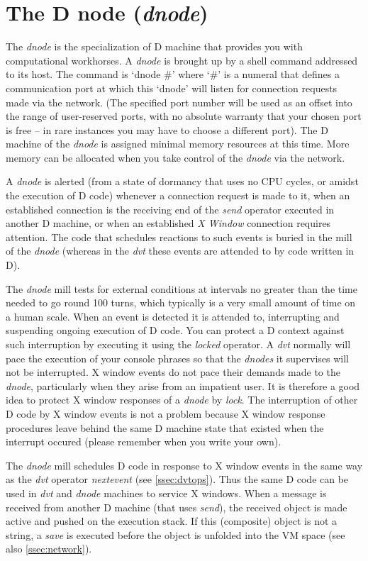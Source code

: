 \section{The D node (\emph{dnode})}\label{sec:dnode}

The \emph{dnode} is the specialization of D machine that provides you with computational workhorses. A \emph{dnode} is brought up by a shell command addressed to its host. The command is `dnode \#' where `\#' is a numeral that defines a communication port at which this `dnode' will listen for connection requests made via the network. (The specified port number will be used as an offset into the range of user-reserved ports, with no absolute warranty that your chosen port is free -- in rare instances you may have to choose a different port). The D machine of the \emph{dnode} is assigned minimal memory resources at this time. More memory can be allocated when you take control of the \emph{dnode} via the network.

 A \emph{dnode} is alerted (from a state of dormancy that uses no CPU cycles, or amidst the execution of D code) whenever a connection request is made to it, when an established connection is the receiving end of the \emph{send} operator executed in another D machine, or when an established \emph{X Window} connection requires attention. The code that schedules reactions to such events is buried in the mill of the \emph{dnode} (whereas in the \emph{dvt} these events are attended to by code written in D).

The \emph{dnode} mill tests for external conditions at intervals no greater than the time needed to go round 100 turns, which typically is a very small amount of time on a human scale. When an event is detected it is attended to, interrupting and suspending ongoing execution of D code.  You can protect a D context against such interruption by executing it using the \emph{locked} operator. A \emph{dvt} normally will pace the execution of your console phrases so that the \emph{dnodes} it supervises will not be interrupted. X window events do not pace their demands made to the \emph{dnode}, particularly when they arise from an impatient user. It is therefore a good idea to protect X window responses of a \emph{dnode} by \emph{lock}. The interruption of other D code by X window events is not a problem because X window response procedures leave behind the same D machine state that existed when the interrupt occured (please remember when you write your own).

The \emph{dnode} mill schedules D code in response to X window events in the same way as the \emph{dvt} operator \emph{nextevent} (see \ref{ssec:dvtops}). Thus the same D code can be used in \emph{dvt} and \emph{dnode} machines to service X windows. When a message is received from another D machine (that uses \emph{send}), the received object is made active and pushed on the execution stack. If this (composite) object is not a string, a \emph{save} is executed before the object is unfolded into the VM space (see also \ref{ssec:network}).

